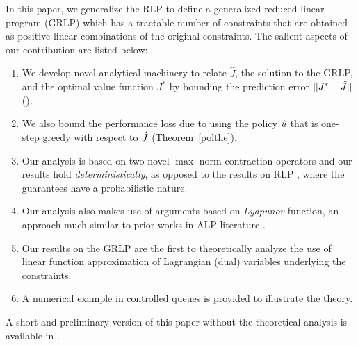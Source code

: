 In this paper, we generalize the RLP to define a generalized reduced linear program (GRLP) which has a tractable number of constraints that are obtained as positive linear combinations of the original constraints.
The salient aspects of our contribution are listed below:
\begin{enumerate}
\item We develop novel analytical machinery to relate $\hat{J}$, the solution to the GRLP, and the optimal value function $J^*$ by bounding the prediction error $||J^*-\hat{J}||$ ().
\item We also bound the performance loss due to using the policy $\hat{u}$ that is one-step greedy with respect to $\hat{J}$ (Theorem~\ref{polthe}).
\item Our analysis is based on two novel $\max$-norm contraction operators and our results hold \emph{deterministically}, as opposed to the results on RLP \cite{SALP,CS}, where the guarantees have a probabilistic nature.
\item Our analysis also makes use of arguments based on \emph{Lyapunov} function, an approach much similar to prior works in ALP literature \cite{ALP,SALP}.
\item Our results on the GRLP are the first to theoretically analyze the use of linear function approximation of Lagrangian (dual) variables underlying the constraints.
\item A numerical example in controlled queues is provided to illustrate the theory.
\end{enumerate}
A short and preliminary version of this paper without the theoretical analysis is available in \cite{aaaipaper}.
